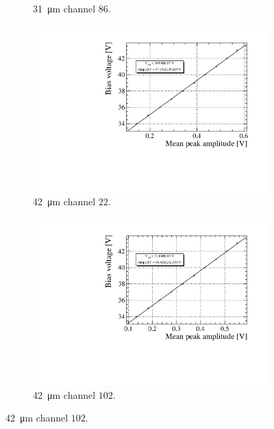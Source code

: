 \begin{figure}[htbp]
\begin{subfigure}{0.48\textwidth}
    \caption{\SI{31}{\micro m} channel $86$.}
  \end{subfigure}
  \caption{}
  \label{}
\end{figure}

\begin{figure}
    \centering
  \begin{subfigure}{0.48\textwidth}
    \includegraphics[width=1\linewidth]{gfx/plots/WA/42/Breakdown_voltage22.pdf}
    \caption{\SI{42}{\micro m} channel $22$.}
  \end{subfigure}
  \hfill
  \begin{subfigure}{0.48\textwidth}
    \includegraphics[width=1\linewidth]{gfx/plots/WA/42/Breakdown_voltage102.pdf}
    \caption{\SI{42}{\micro m} channel $102$.}
  \end{subfigure}
  \hfill

\end{figure}
